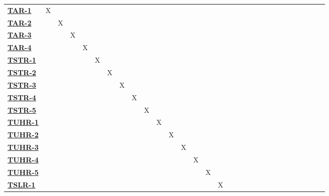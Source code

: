 \documentclass[12pt, titlepage]{article}
\begin{document}
\begin{landscape}
\begin{table}[H]
\begin{adjustbox}{width=1.2\textwidth}
\begin{tabular}{l|ccccccccccccccccccccccccc}
        \hyperref[TAR-1]{\textbf{TAR-1}}  & X & ~ & ~ & ~ & ~ & ~ & ~ & ~ & ~ & ~ & ~ & ~ & ~ & ~ & ~ & ~ & ~ & ~ & ~ & ~ & ~ & ~ & ~\\
        \hyperref[TAR-2]{\textbf{TAR-2}}    & ~ & X & ~ & ~ & ~ & ~ & ~ & ~ & ~ & ~ & ~ & ~ & ~ & ~ & ~ & ~ & ~ & ~ & ~ & ~ & ~ & ~ & ~\\
        \hyperref[TAR-3]{\textbf{TAR-3}}  & ~ & ~ & X & ~ & ~ & ~ & ~ & ~ & ~ & ~ & ~ & ~ & ~ & ~ & ~ & ~ & ~ & ~ & ~ & ~ & ~ & ~ & ~\\
        \hyperref[TAR-4]{\textbf{TAR-4}}  & ~ & ~ & ~ & X & ~ & ~ & ~ & ~ & ~ & ~ & ~ & ~ & ~ & ~ & ~ & ~ & ~ & ~ & ~ & ~ & ~ & ~ & ~\\
        \hyperref[TSTR-1]{\textbf{TSTR-1}}  & ~ & ~ & ~ & ~ & X & ~ & ~ & ~ & ~ & ~ & ~ & ~ & ~ & ~ & ~ & ~ & ~ & ~ & ~ & ~ & ~ & ~ & ~\\
        \hyperref[TSTR-2]{\textbf{TSTR-2}}  & ~ & ~ & ~ & ~ & ~ & X & ~ & ~ & ~ & ~ & ~ & ~ & ~ & ~ & ~ & ~ & ~ & ~ & ~ & ~ & ~ & ~ & ~\\
        \hyperref[TSTR-3]{\textbf{TSTR-3}}  & ~ & ~ & ~ & ~ & ~ & ~ & X & ~ & ~ & ~ & ~ & ~ & ~ & ~ & ~ & ~ & ~ & ~ & ~ & ~ & ~ & ~ & ~\\
        \hyperref[TSTR-4]{\textbf{TSTR-4}}  & ~ & ~ & ~ & ~ & ~ & ~ & ~ & X & ~ & ~ & ~ & ~ & ~ & ~ & ~ & ~ & ~ & ~ & ~ & ~ & ~ & ~ & ~\\
        \hyperref[TSTR-5]{\textbf{TSTR-5}}  & ~ & ~ & ~ & ~ & ~ & ~ & ~ & ~ & X & ~ & ~ & ~ & ~ & ~ & ~ & ~ & ~ & ~ & ~ & ~ & ~ & ~ & ~\\
        \hyperref[TUHR-1]{\textbf{TUHR-1}}  & ~ & ~ & ~ & ~ & ~ & ~ & ~ & ~ & ~ & X & ~ & ~ & ~ & ~ & ~ & ~ & ~ & ~ & ~ & ~ & ~ & ~ & ~\\
        \hyperref[TUHR-2]{\textbf{TUHR-2}}    & ~ & ~ & ~ & ~ & ~ & ~ & ~ & ~ & ~ & ~ & X & ~ & ~ & ~ & ~ & ~ & ~ & ~ & ~ & ~ & ~ & ~ & ~\\
        \hyperref[TUHR-3]{\textbf{TUHR-3}}  & ~ & ~ & ~ & ~ & ~ & ~ & ~ & ~ & ~ & ~ & ~ & X & ~ & ~ & ~ & ~ & ~ & ~ & ~ & ~ & ~ & ~ & ~\\
        \hyperref[TUHR-4]{\textbf{TUHR-4}}  & ~ & ~ & ~ & ~ & ~ & ~ & ~ & ~ & ~ & ~ & ~ & ~ & X & ~ & ~ & ~ & ~ & ~ & ~ & ~ & ~ & ~ & ~\\
        \hyperref[TUHR-5]{\textbf{TUHR-5}}  & ~ & ~ & ~ & ~ & ~ & ~ & ~ & ~ & ~ & ~ & ~ & ~ & ~ & X & ~ & ~ & ~ & ~ & ~ & ~ & ~ & ~ & ~\\
        \hyperref[TSLR-1]{\textbf{TSLR-1}}  & ~ & ~ & ~ & ~ & ~ & ~ & ~ & ~ & ~ & ~ & ~ & ~ & ~ & ~ & X & ~ & ~ & ~ & ~ & ~ & ~ & ~ & ~\\

\end{tabular}
\end{adjustbox}
\end{table}
\end{landscape}
\end{document}
